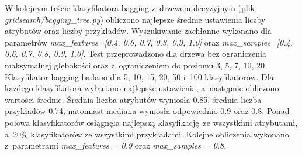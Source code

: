 \par
W kolejnym teście klasyfikatora bagging z~drzewem decyzyjnym (plik \textit{gridsearch/bagging\_tree.py}) obliczono najlepsze średnie ustawienia liczby atrybutów oraz liczby przykładów. Wyszukiwanie zachłanne wykonano dla parametrów \textit{max\_features=[0.4, 0.6, 0.7, 0.8, 0.9, 1.0]} oraz \textit{max\_samples=[0.4, 0.6, 0.7, 0.8, 0.9, 1.0]}. Test przeprowadzono dla drzewa bez ograniczenia maksymalnej głębokości oraz z~ograniczeniem do poziomu 3, 5, 7, 10, 20. Klasyfikator bagging badano dla 5, 10, 15, 20, 50 i~100 klasyfikatorów. Dla każdego klasyfikatora wyłaniano najlepsze ustawienia, a~następnie obliczono wartości średnie. Średnia liczba atrybutów wyniosła 0.85, średnia liczba przykładów 0.74, natomiast mediana wyniosła odpowiednio 0.9 oraz 0.8. Ponad połowa klasyfikatorów osiągnęła najlepszą klasyfikację ze wszystkimi atrybutami, a~20\% klasyfikatorów ze wszystkimi przykładami. Kolejne obliczenia wykonano z~parametrami \textit{max\_features = 0.9} oraz \textit{max\_samples = 0.8}. 
